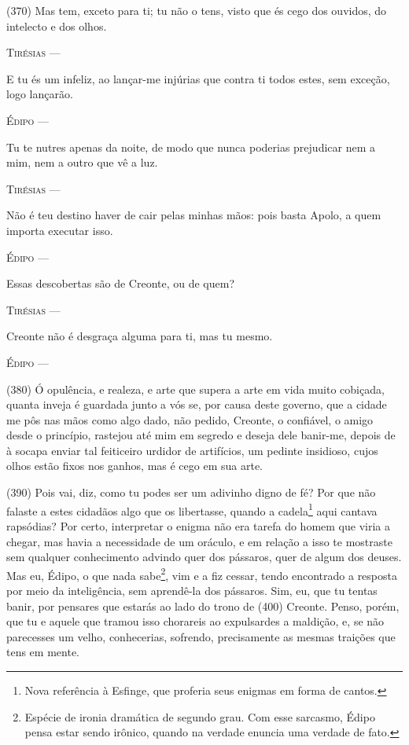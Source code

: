 (370) Mas tem, exceto para ti; tu não o tens, visto que és cego dos
ouvidos, do intelecto e dos olhos.

\textsc{Tirésias} ---

E tu és um infeliz, ao lançar-me injúrias que contra ti todos estes, sem
exceção, logo lançarão.

\textsc{Édipo} ---

Tu te nutres apenas da noite, de modo que nunca poderias prejudicar nem
a mim, nem a outro que vê a luz.

\textsc{Tirésias} ---

Não é teu destino haver de cair pelas minhas mãos: pois basta Apolo, a
quem importa executar isso.

\textsc{Édipo} ---

Essas descobertas são de Creonte, ou de quem?

\textsc{Tirésias} ---

Creonte não é desgraça alguma para ti, mas tu mesmo.

\textsc{Édipo} ---

(380) Ó opulência, e realeza, e arte que supera a arte em vida muito
cobiçada, quanta inveja é guardada junto a vós se, por causa deste
governo, que a cidade me pôs nas mãos como algo dado, não pedido,
Creonte, o confiável, o amigo desde o princípio, rastejou até mim em
segredo e deseja dele banir-me, depois de à socapa enviar tal feiticeiro
urdidor de artifícios, um pedinte insidioso, cujos olhos estão fixos nos
ganhos, mas é cego em sua arte.

(390) Pois vai, diz, como tu podes ser um adivinho digno de fé? Por que
não falaste a estes cidadãos algo que os libertasse, quando a
cadela\footnote{Nova referência à Esfinge, que proferia seus enigmas em
  forma de cantos.} aqui cantava rapsódias? Por certo, interpretar o
enigma não era tarefa do homem que viria a chegar, mas havia a
necessidade de um oráculo, e em relação a isso te mostraste sem qualquer
conhecimento advindo quer dos pássaros, quer de algum dos deuses. Mas
eu, Édipo, o que nada sabe\footnote{Espécie de ironia dramática de
  segundo grau. Com esse sarcasmo, Édipo pensa estar sendo irônico,
  quando na verdade enuncia uma verdade de fato.}, vim e a fiz cessar,
tendo encontrado a resposta por meio da inteligência, sem aprendê-la dos
pássaros. Sim, eu, que tu tentas banir, por pensares que estarás ao lado
do trono de (400) Creonte. Penso, porém, que tu e aquele que tramou isso
chorareis ao expulsardes a maldição, e, se não parecesses um velho,
conhecerias, sofrendo, precisamente as mesmas traições que tens em
mente.

